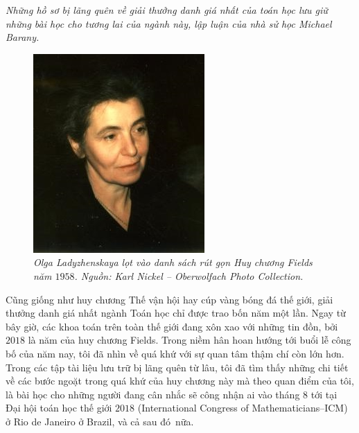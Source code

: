 \vspace*{215pt}

\begin{multicols}{2}
	\textit{
		Những hồ sơ bị lãng quên về giải thưởng danh giá nhất của toán học lưu giữ những bài học cho tương lai của ngành này, lập luận của nhà sử học Michael Barany.}
	\begin{figure}[H]
		\vspace*{-5pt}
		\centering
		\captionsetup{labelformat= empty, justification=centering}
		\includegraphics[width= 0.85\linewidth]{OlgaLadyzhenskaya}
		\caption{\small\textit{\color{lichsutoanhoc}Olga Ladyzhenskaya lọt vào danh sách rút gọn Huy chương Fields năm $1958$. Nguồn: Karl Nickel -- Oberwolfach Photo Collection.}}
		\vspace*{-10pt}
	\end{figure}
	Cũng giống như huy chương Thế vận hội hay cúp vàng bóng đá thế giới, giải thưởng danh giá nhất ngành Toán học chỉ được trao bốn năm một lần. Ngay từ bây giờ, các khoa toán trên toàn thế giới đang xôn xao với những tin đồn, bởi $2018$ là năm của huy chương Fields.
	\vskip 0.1cm
	Trong niềm hân hoan hướng tới buổi lễ công bố của năm nay, tôi đã nhìn về quá khứ với sự quan tâm thậm chí còn lớn hơn. Trong các tập tài liệu lưu trữ bị lãng quên từ lâu, tôi đã tìm thấy những chi tiết về các bước ngoặt trong quá khứ của huy chương này mà theo quan điểm của tôi, là bài học cho những người đang cân nhắc sẽ công nhận ai vào tháng $8$ tới tại Đại hội toán học thế giới $2018$ (International Congress of Mathematicians--ICM) ở Rio de Janeiro ở Brazil, và cả sau đó~nữa.

\end{multicols}

